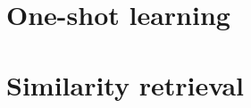 \section{One-shot learning}
\label{sec:related:oneshot}
\begin{my_list}
    \item \citet{liu_ssd:_2016}
    \item \citet{vinyals_matching_2016}
\end{my_list}

\section{Similarity retrieval}
\label{sec:related:retrieval}
\begin{my_list}
    \item \citet{sermanet_overfeat:_2013}
    \item \citet{wang_learning_2014}
    \item \citet{chen_visual-based_2015}
\end{my_list}
